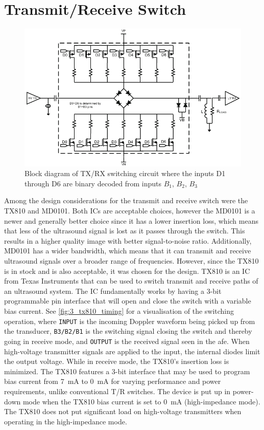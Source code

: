 \section{Transmit/Receive Switch}
\begin{figure}[htbp]
	\centering
	\includegraphics[width=.8\textwidth]{Figures/3_switch_tx810_block.pdf}
	\caption{Block diagram of TX/RX switching circuit where the inputs D1 through D6 are binary decoded from inputs $B_1$, $B_2$, $B_3$ \cite{TX810}}
	\label{fig:3_switch}
\end{figure}
Among the design considerations for the transmit and receive switch were the TX810\cite{TX810} and MD0101\cite{MD0101}. Both ICs are acceptable choices, however the MD0101 is a newer and generally better choice since it has a lower insertion loss, which means that less of the ultrasound signal is lost as it passes through the switch. This results in a higher quality image with better signal-to-noise ratio. Additionally, MD0101 has a wider bandwidth, which means that it can transmit and receive ultrasound signals over a broader range of frequencies. However, since the TX810 is in stock and is also acceptable, it was chosen for the design. TX810 is an IC from Texas Instruments that can be used to switch transmit and receive paths of an ultrasound system. The IC fundamentally works by having a 3-bit programmable pin interface that will open and close the switch with a variable bias current. See \cref{fig:3_tx810_timing} for a visualisation of the switching operation, where \texttt{INPUT} is the incoming Doppler waveform being picked up from the transducer, \texttt{B3/B2/B1} is the switching signal closing the switch and thereby going in receive mode, and \texttt{OUTPUT} is the received signal seen in the \gls{afe}. When high-voltage transmitter signals are applied to the input, the internal diodes limit the output voltage. While in receive mode, the TX810's insertion loss is minimized. The TX810 features a 3-bit interface that may be used to program bias current from \qty{7}{\milli\ampere} to \qty{0}{\milli\ampere} for varying performance and power requirements, unlike conventional T/R switches. The device is put up in power-down mode when the TX810 bias current is set to \qty{0}{\milli\ampere} (high-impedance mode). The TX810 does not put significant load on high-voltage transmitters when operating in the high-impedance mode.
